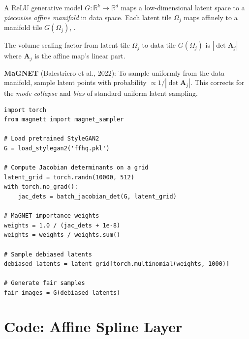 A ReLU generative model $G: \mathbb{R}^k \to \mathbb{R}^d$ maps a low-dimensional latent space to a \emph{piecewise affine manifold} in data space. Each latent tile $\Omega_j$ maps affinely to a manifold tile $G(\Omega_j)$, \cite{balestriero2025geometry}.

\begin{theorem}
The volume scaling factor from latent tile $\Omega_j$ to data tile $G(\Omega_j)$ is $|\det \bm{A}_j|$ where $\bm{A}_j$ is the affine map's linear part.
\end{theorem}

\textbf{MaGNET} (Balestriero et al., 2022): To sample uniformly from the data manifold, sample latent points with probability $\propto 1/|\det \bm{A}_j|$. This corrects for the \emph{mode collapse} and \emph{bias} of standard uniform latent sampling.

\begin{lstlisting}[style=python,caption=MaGNET debiasing for StyleGAN]
import torch
from magnett import magnet_sampler

# Load pretrained StyleGAN2
G = load_stylegan2('ffhq.pkl')

# Compute Jacobian determinants on a grid
latent_grid = torch.randn(10000, 512)
with torch.no_grad():
    jac_dets = batch_jacobian_det(G, latent_grid)

# MaGNET importance weights
weights = 1.0 / (jac_dets + 1e-8)
weights = weights / weights.sum()

# Sample debiased latents
debiased_latents = latent_grid[torch.multinomial(weights, 1000)]

# Generate fair samples
fair_images = G(debiased_latents)
\end{lstlisting}

\section{Code: Affine Spline Layer}
\label{sec:dl:code}

